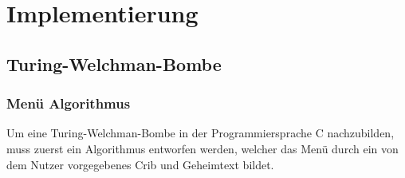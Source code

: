 \chapter{Implementierung}\label{ch:impl}


\section{Turing-Welchman-Bombe}\label{sec:impl_bombe}
%
%
\subsection{Menü Algorithmus}\label{subsec:cycle-finding-algorithm}
Um eine Turing-Welchman-Bombe in der Programmiersprache C nachzubilden, muss zuerst ein Algorithmus entworfen werden, welcher das Menü durch ein von dem Nutzer vorgegebenes Crib und 
Geheimtext bildet.


